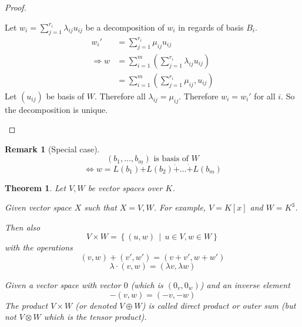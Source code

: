 \documentclass[a4paper,landscape,twocolumn]{article}
\newcommand\setdef[2]{\left\{#1\,\middle|\,#2\right\}}
\newtheorem{theorem}{Theorem}
\newtheorem{rem}{Remark}
\begin{document}
\begin{proof}
\begin{description}
      Let $w_i = \sum_{j=1}^{r_i} \lambda_{ij} u_{ij}$ be a decomposition of $w_i$ in regards of basis $B_i$.
      \begin{align*}
        w_i' &= \sum_{j=1}^{r_i} \mu_{ij} u_{ij} \\
        \Rightarrow w &= \sum_{i=1}^m \left(\sum_{j=1}^{r_i} \lambda_{ij} u_{ij}\right) \\
         &= \sum_{i=1}^m \left(\sum_{j=1}^{r_i} \mu_{ij}, u_{ij}\right)
      \end{align*}
      Let $(u_{ij})$ be basis of $W$. Therefore all $\lambda_{ij} = \mu_{ij}$.
      Therefore $w_i = w_i'$ for all $i$. So the decomposition is unique.
  \end{description}
\end{proof}

\begin{rem}[Special case]
  \[ (b_1, \dots, b_m) \text{ is basis of } W \]
  \[ \Leftrightarrow w = L(b_1) \dot{+} L(b_2) \dot{+} \dots \dot{+} L(b_m) \]
\end{rem}

\begin{theorem}
  \label{satz-4-16}
  Let $V, W$ be vector spaces over $K$.

  Given vector space $X$ such that $X = V,W$.
  For example, $V = K[x]$ and $W = K^3$.

  Then also
  \[ V \times W = \setdef{(u,w)}{u \in V, w \in W} \]
  with the operations
  \[ (v,w) + (v',w') = (v + v', w + w') \]
  \[ \lambda \cdot (v, w) = (\lambda v, \lambda w) \]

  Given a vector space with vector $0$ (which is $(0_v, 0_w)$)
  and an inverse element
  \[ -(v, w) = (-v, -w) \]
  The product $V \times W$ (or denoted $V \oplus W$)
  is called \emph{direct product} or \emph{outer sum}
  (but not $V \otimes W$ which is the tensor product).
\end{theorem}
\end{document}
